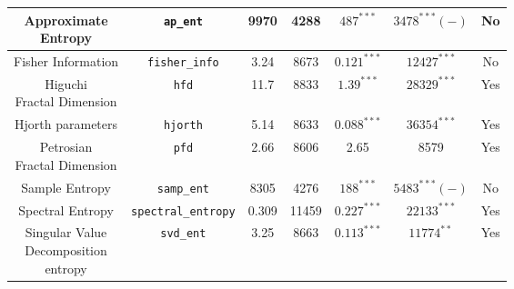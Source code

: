 \begin {table}[!h]
\begin{center}
\begin{tabular}{|c|c|c|c|c|c|c|}
  \hline
  \hline
\specialcell{Approximate\\Entropy} & \texttt{ap\_ent} & 									9970 & 4288 & $487^{***}$ & $3478^{***}(-)$ & No\\
\hline
Fisher Information & \texttt{fisher\_info} & 								3.24 & 8673 & $0.121^{***}$ & $12427^{***}$ & No\\
\hline
\specialcell{Higuchi\\Fractal Dimension} & \texttt{hfd} &	 				11.7 & 8833 & $1.39^{***}$ & $28329^{***}$ & Yes\\
\hline
Hjorth parameters & \texttt{hjorth} & 										5.14 & 8633 & $0.088^{***}$ & $36354^{***}$ & Yes\\
\hline
\specialcell{Petrosian\\Fractal Dimension} & \texttt{pfd} & 				2.66 & 8606 & 2.65 & 8579 & Yes\\
\hline
Sample Entropy & \texttt{samp\_ent} & 										8305 & 4276 & $188^{***}$ & $5483^{***}(-)$ & No\\
\hline
Spectral Entropy & \texttt{spectral\_entropy} & 								0.309 & 11459 & $0.227^{***}$ & $22133^{***}$ & Yes\\
\hline
\specialcell[l]{Singular Value \\Decomposition\\ entropy} & \texttt{svd\_ent} & 	3.25 & 8663 & $0.113^{***}$ & $11774^{**}$ & Yes\\
 \hline



\end{tabular}
\end{center}
\end{table}
